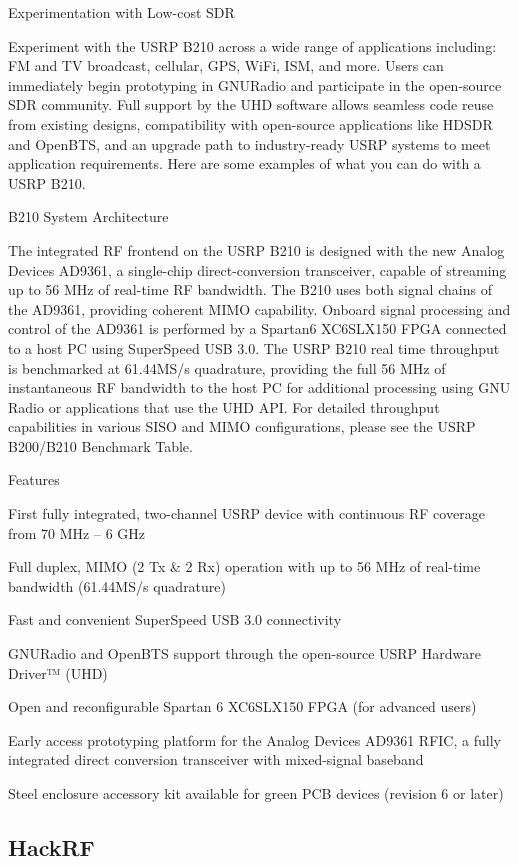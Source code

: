 \documentclass[
  12pt,				%
  openright,			%
  twoside,			%
  a4paper,			%
  english,			%
  french,				%
  spanish,			%
  brazil,				%
  ]{abntex2}
\begin{document}
Experimentation with Low-cost SDR

Experiment with the USRP B210 across a wide range of applications including: FM and TV broadcast, cellular, GPS, WiFi, ISM, and more. Users can immediately begin prototyping in GNURadio and participate in the open-source SDR community. Full support by the UHD software allows seamless code reuse from existing designs, compatibility with open-source applications like HDSDR and OpenBTS, and an upgrade path to industry-ready USRP systems to meet application requirements.  Here are some examples of what you can do with a USRP B210.

B210 System Architecture

The integrated RF frontend on the USRP B210 is designed with the new Analog Devices AD9361, a single-chip direct-conversion transceiver, capable of streaming up to 56 MHz of real-time RF bandwidth. The B210 uses both signal chains of the AD9361, providing coherent MIMO capability. Onboard signal processing and control of the AD9361 is performed by a Spartan6 XC6SLX150 FPGA connected to a host PC using SuperSpeed USB 3.0. The USRP B210 real time throughput is benchmarked at 61.44MS/s quadrature, providing the full 56 MHz of instantaneous RF bandwidth to the host PC for additional processing using GNU Radio or applications that use the UHD API. For detailed throughput capabilities in various SISO and MIMO configurations, please see the USRP B200/B210 Benchmark Table.

Features

First fully integrated, two-channel USRP device with continuous RF coverage from 70 MHz – 6 GHz

Full duplex, MIMO (2 Tx \& 2 Rx) operation with up to 56 MHz of real-time bandwidth (61.44MS/s quadrature)

Fast and convenient SuperSpeed USB 3.0 connectivity

GNURadio and OpenBTS support through the open-source USRP Hardware Driver™ (UHD)

Open and reconfigurable Spartan 6 XC6SLX150 FPGA (for advanced users)

Early access prototyping platform for the Analog Devices AD9361 RFIC, a fully integrated direct conversion transceiver with mixed-signal baseband

Steel enclosure accessory kit available for green PCB devices (revision 6 or later)

\subsection*{HackRF}
\end{document}
